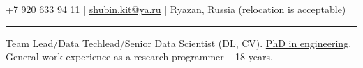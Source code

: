 \documentclass[11pt]{article}
\begin{document}
	
	\vspace{0.5em}
	
	\noindent +7 920 633 94 11 | \href{mailto:shubin.kit@ya.ru}{shubin.kit@ya.ru} | Ryazan, Russia (relocation is acceptable)
	\vspace{0.5em}
	\hrule
	
	
	
	\vspace{1em}
	
	 Team Lead/Data Techlead/Senior Data Scientist (DL, CV). \href{https://disk.yandex.ru/i/ffl8gXNlYxGT8g}{PhD in engineering}. General work experience as a research programmer -- 18 years.\\

	
\end{document}
